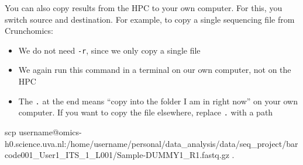 \documentclass[
  letterpaper,
  DIV=11,
  numbers=noendperiod]{scrreprt}
\newenvironment{Shaded}{}{}
\newcommand{\FunctionTok}[1]{\textcolor[rgb]{0.44,0.26,0.76}{#1}}
\newcommand{\NormalTok}[1]{\textcolor[rgb]{0.14,0.16,0.18}{#1}}
\providecommand{\tightlist}{%
  \setlength{\itemsep}{0pt}\setlength{\parskip}{0pt}}
\begin{document}
\begin{tcolorbox}[enhanced jigsaw, colbacktitle=quarto-callout-tip-color!10!white, rightrule=.15mm, leftrule=.75mm, colback=white, opacitybacktitle=0.6, title=\textcolor{quarto-callout-tip-color}{\faLightbulb}\hspace{0.5em}{Tip: Moving data from the HPC to your own computer (optional)}, bottomrule=.15mm, left=2mm, colframe=quarto-callout-tip-color-frame, opacityback=0, breakable, bottomtitle=1mm, coltitle=black, arc=.35mm, toprule=.15mm, toptitle=1mm, titlerule=0mm]

You can also copy results from the HPC to your own computer. For this,
you switch source and destination. For example, to copy a single
sequencing file from Crunchomics:

\begin{itemize}
\tightlist
\item
  We do not need \texttt{-r}, since we only copy a single file
\item
  We again run this command in a terminal on our own computer, not on
  the HPC
\item
  The \texttt{.} at the end means ``copy into the folder I am in right
  now'' on your own computer. If you want to copy the file elsewhere,
  replace \texttt{.} with a path
\end{itemize}

\begin{Shaded}
\begin{Highlighting}[]
\FunctionTok{scp}\NormalTok{ username@omics{-}h0.science.uva.nl:/home/username/personal/data\_analysis/data/seq\_project/barcode001\_User1\_ITS\_1\_L001/Sample{-}DUMMY1\_R1.fastq.gz .}
\end{Highlighting}
\end{Shaded}

\end{tcolorbox}
\end{document}
